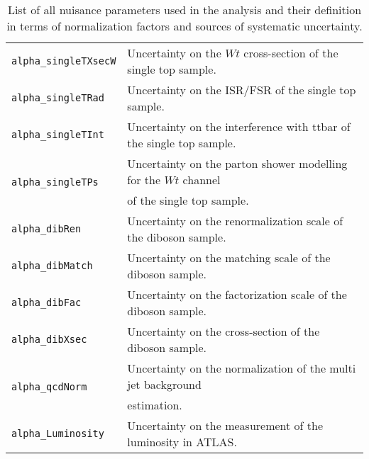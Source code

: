 \begin{table}
\begin{center}
\begin{scriptsize}
\begin{tabular}{|l|l|}
\texttt{alpha\_singleTXsecW} & Uncertainty on the $Wt$ cross-section of the single top sample. \\ 
\texttt{alpha\_singleTRad  } & Uncertainty on the ISR/FSR of the single top sample. \\ 
\texttt{alpha\_singleTInt  } & Uncertainty on the interference with ttbar of the single top sample. \\ 
\multirow{2}{*}{\texttt{alpha\_singleTPs}}    & Uncertainty on the parton shower modelling for the $Wt$ channel \\
                    & of the single top sample. \\ 
\texttt{alpha\_dibRen      } & Uncertainty on the renormalization scale of the diboson sample.  \\ 
\texttt{alpha\_dibMatch    } & Uncertainty on the matching scale of the diboson sample. \\ 
\texttt{alpha\_dibFac      } & Uncertainty on the factorization scale of the diboson sample.  \\ 
\texttt{alpha\_dibXsec     } & Uncertainty on the cross-section of the diboson sample. \\ 
\multirow{2}{*}{\texttt{alpha\_qcdNorm}}      & Uncertainty on the normalization of the multi jet background \\
                    & estimation. \\
\texttt{alpha\_Luminosity  } & Uncertainty on the measurement of the luminosity in ATLAS. \\ \hline
\end{tabular}
\end{scriptsize}
\end{center}
\caption{List of all nuisance parameters used in the analysis and their definition in terms of
normalization factors and sources of systematic uncertainty.}
\label{tab:monosyslist}
\end{table} 
